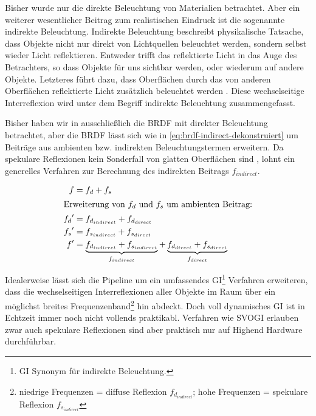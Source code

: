 Bisher wurde nur die direkte Beleuchtung von Materialien betrachtet. Aber ein weiterer wesentlicher Beitrag zum realistischen Eindruck ist die sogenannte indirekte Beleuchtung. Indirekte Beleuchtung beschreibt physikalische Tatsache, dass Objekte nicht nur direkt von Lichtquellen beleuchtet werden, sondern selbst wieder Licht reflektieren. Entweder trifft das reflektierte Licht in das Auge des Betrachters, so dass Objekte für uns sichtbar werden, oder wiederum auf andere Objekte. Letzteres führt dazu, dass Oberflächen durch das von anderen Oberflächen reflektierte Licht zusätzlich beleuchtet werden . Diese wechselseitige Interreflexion wird unter dem Begriff indirekte Beleuchtung zusammengefasst.

Bisher haben wir in  ausschließlich die \ac{BRDF} mit direkter Beleuchtung betrachtet, aber die \ac{BRDF} lässt sich wie in \ref{eq:brdf-indirect-dekonstruiert} um Beiträge aus ambienten bzw. indirekten Beleuchtungstermen erweitern. Da spekulare Reflexionen kein Sonderfall von glatten Oberflächen sind \parencite{Hable2010}, lohnt ein generelles Verfahren zur Berechnung des indirekten Beitrags $f_{indirect}$. 

\begin{align}
	\label{eq:brdf-indirect}
	f   &= f_d + f_s\\
	\intertext{Erweiterung von $f_d$ und $f_s$ um ambienten Beitrag:}
	{f_d}^{\prime} &= f_{d_{indirect}} + f_{d_{direct}}\\
	{f_s}^{\prime} &= f_{s_{indirect}} + f_{s_{direct}}\\
	\label{eq:brdf-indirect-dekonstruiert}
	f^{\prime}   &= \underbrace{f_{d_{indirect}} + f_{s_{indirect}}}_{f_{indirect}} + \underbrace{f_{d_{direct}} + f_{s_{direct}}}_{f_{direct}}
\end{align}

Idealerweise lässt sich die Pipeline um ein umfassendes \acf{GI}\footnote{\acl{GI} Synonym für indirekte Beleuchtung.} Verfahren erweiteren, dass die wechselseitigen Interreflexionen aller Objekte im Raum über ein möglichst breites Frequenzenband\footnote{niedrige Frequenzen = diffuse Reflexion $f_{d_{indirect}}$; hohe Frequenzen = spekulare Reflexion $f_{s_{indirect}}$} hin abdeckt. Doch voll dynamisches \ac{GI} ist in Echtzeit immer noch nicht vollends praktikabl. Verfahren wie \ac{SVOGI} \parencite{Lin2013} erlauben zwar auch spekulare Reflexionen sind aber praktisch nur auf Highend Hardware durchführbar.

